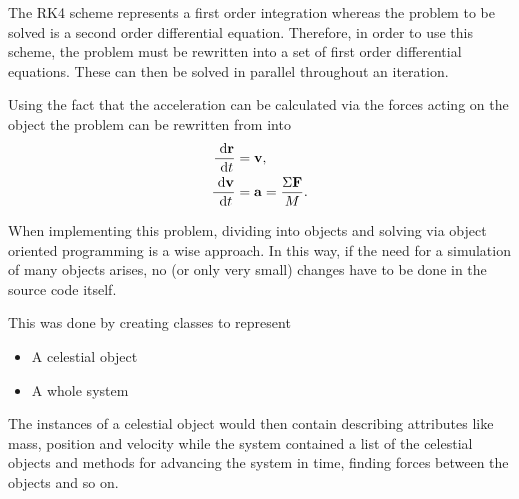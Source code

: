 The RK4 scheme represents a first order integration whereas the
problem to be solved is a second order differential equation.
Therefore, in order to use this scheme, the problem must be
rewritten into a set of first order differential equations. These
can then be solved in parallel throughout an iteration.

Using the fact that the acceleration can be calculated via the
forces acting on the object the problem can be rewritten from
 into
\begin{align}
    \frac{\ \mathrm{d}\mathbf{r}}{\ \mathrm{d}t} &= \mathbf{v}, \label{diffSetFirstR} \\
    \frac{\ \mathrm{d}\mathbf{v}}{\ \mathrm{d}t} &= \mathbf{a} = \frac{\Sigma
        \mathbf{F}}{M}.
    \label{diffSetFirstV}
\end{align}

When implementing this problem, dividing into objects and solving
via object oriented programming is a wise approach. In this way, if
the need for a simulation of many objects arises, no (or only very
small) changes have to be done in the source code itself.

This was done by creating classes to represent
\begin{itemize}
    \item A celestial object
    \item A whole system
\end{itemize}
The instances of a celestial object would then contain describing
attributes like mass, position and velocity while the system
contained a list of the celestial objects and methods for advancing
the system in time, finding forces between the objects and so on.

